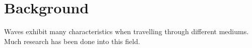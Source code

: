 \chapter{Background}
Waves exhibit many characteristics when travelling through different mediums.
Much research has been done into this field.


